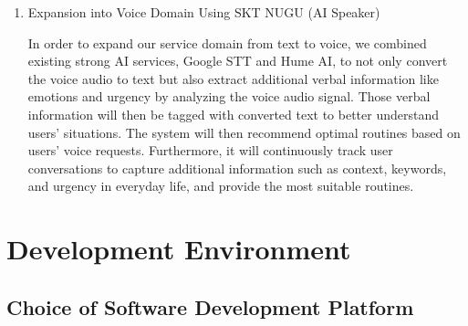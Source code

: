 \documentclass[conference]{IEEEtran}
\begin{document}
\begin{enumerate}[label=\arabic*]
    \item Expansion into Voice Domain Using SKT NUGU (AI Speaker)\par
    \vspace{0.3em}
    In order to expand our service domain from text to voice, we combined existing strong AI services, Google STT and Hume AI, to not only convert the voice audio to text but also extract additional verbal information like emotions and urgency by analyzing the voice audio signal. Those verbal information will then be tagged with converted text to better understand users’ situations. The system will then recommend optimal routines based on users' voice requests. Furthermore, it will continuously track user conversations to capture additional information such as context, keywords, and urgency in everyday life, and provide the most suitable routines.
\end{enumerate}

\vspace{1em} %

\section{Development Environment}

\vspace{1em} %

\subsection{Choice of Software Development Platform}
\vspace{0.5em}
\end{document}
